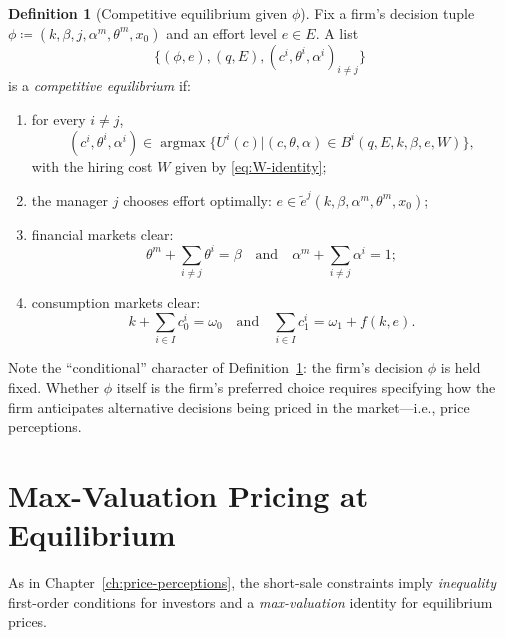 \documentclass[11pt,a4paper,oneside]{book}
\def\et{\quad \text{and} \quad}
\DeclareMathOperator*{\argmax}{argmax}
\theoremstyle{plain}
\theoremstyle{definition}
\newtheorem{definition}[theorem]{Definition}
\theoremstyle{remark}
\numberwithin{equation}{chapter}
\begin{document}
\begin{definition}[Competitive equilibrium given $\phi$]\label{def:eq-MH-CPP}
Fix a firm's decision tuple $\phi \coloneqq (k, \beta, j, \alpha^m, \theta^m, x_0)$ and an effort level $e \in E$.
A list
\begin{equation*}
  \bigl\{ (\phi, e), (q, E), (c^i, \theta^i, \alpha^i)_{i \neq j} \bigr\}
\end{equation*}
is a \emph{competitive equilibrium} if:
\begin{enumerate}
  \item[(a)] for every $i \neq j$,
  \begin{equation*}
    (c^i, \theta^i, \alpha^i) \in \argmax \bigl\{ U^i(c) \vert (c, \theta, \alpha) \in B^i(q, E, k, \beta, e, W) \bigr\},
  \end{equation*}
  with the hiring cost $W$ given by \eqref{eq:W-identity};
  \item[(b)] the manager $j$ chooses effort optimally: $e \in \widetilde{e}^j(k, \beta, \alpha^m, \theta^m, x_0)$;
  \item[(c)] financial markets clear:
  \begin{equation*}
    \theta^m + \sum_{i \neq j} \theta^i = \beta
    \et
    \alpha^m + \sum_{i \neq j} \alpha^i = 1;
  \end{equation*}
  \item[(d)] consumption markets clear:
  \begin{equation*}
    k + \sum_{i \in I} c^i_0 = \omega_0
    \et
    \sum_{i \in I} c^i_1 = \omega_1 + f(k, e).
  \end{equation*}
\end{enumerate}
\end{definition}

Note the ``conditional'' character of Definition~\ref{def:eq-MH-CPP}: the firm's decision $\phi$ is held fixed.
Whether $\phi$ itself is the firm's preferred choice requires specifying how the firm anticipates alternative decisions being priced in the market---i.e., price perceptions.

\section{Max-Valuation Pricing at Equilibrium}
\label{sec:MH-CPP-pricing}

As in Chapter~\ref{ch:price-perceptions}, the short-sale constraints imply \emph{inequality} first-order conditions for investors and a \emph{max-valuation} identity for equilibrium prices.
\end{document}
